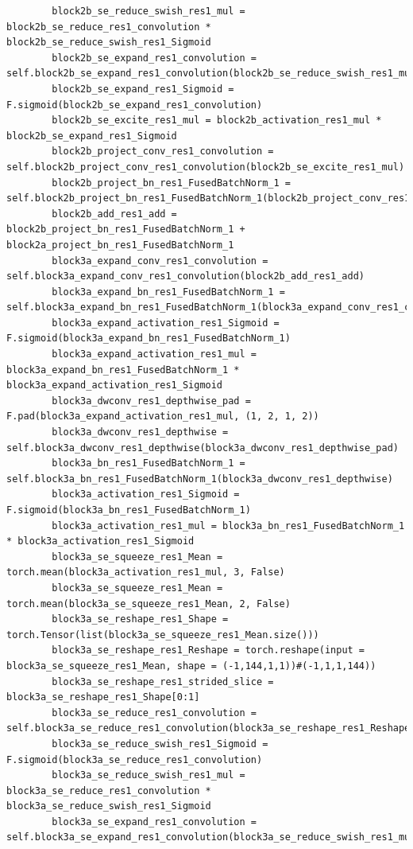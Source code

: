\documentclass{fisatprojectfinal}
\begin{document}
\begin{appendices}
\begin{lstlisting}
        block2b_se_reduce_swish_res1_mul = block2b_se_reduce_res1_convolution * block2b_se_reduce_swish_res1_Sigmoid
        block2b_se_expand_res1_convolution = self.block2b_se_expand_res1_convolution(block2b_se_reduce_swish_res1_mul)
        block2b_se_expand_res1_Sigmoid = F.sigmoid(block2b_se_expand_res1_convolution)
        block2b_se_excite_res1_mul = block2b_activation_res1_mul * block2b_se_expand_res1_Sigmoid
        block2b_project_conv_res1_convolution = self.block2b_project_conv_res1_convolution(block2b_se_excite_res1_mul)
        block2b_project_bn_res1_FusedBatchNorm_1 = self.block2b_project_bn_res1_FusedBatchNorm_1(block2b_project_conv_res1_convolution)
        block2b_add_res1_add = block2b_project_bn_res1_FusedBatchNorm_1 + block2a_project_bn_res1_FusedBatchNorm_1
        block3a_expand_conv_res1_convolution = self.block3a_expand_conv_res1_convolution(block2b_add_res1_add)
        block3a_expand_bn_res1_FusedBatchNorm_1 = self.block3a_expand_bn_res1_FusedBatchNorm_1(block3a_expand_conv_res1_convolution)
        block3a_expand_activation_res1_Sigmoid = F.sigmoid(block3a_expand_bn_res1_FusedBatchNorm_1)
        block3a_expand_activation_res1_mul = block3a_expand_bn_res1_FusedBatchNorm_1 * block3a_expand_activation_res1_Sigmoid
        block3a_dwconv_res1_depthwise_pad = F.pad(block3a_expand_activation_res1_mul, (1, 2, 1, 2))
        block3a_dwconv_res1_depthwise = self.block3a_dwconv_res1_depthwise(block3a_dwconv_res1_depthwise_pad)
        block3a_bn_res1_FusedBatchNorm_1 = self.block3a_bn_res1_FusedBatchNorm_1(block3a_dwconv_res1_depthwise)
        block3a_activation_res1_Sigmoid = F.sigmoid(block3a_bn_res1_FusedBatchNorm_1)
        block3a_activation_res1_mul = block3a_bn_res1_FusedBatchNorm_1 * block3a_activation_res1_Sigmoid
        block3a_se_squeeze_res1_Mean = torch.mean(block3a_activation_res1_mul, 3, False)
        block3a_se_squeeze_res1_Mean = torch.mean(block3a_se_squeeze_res1_Mean, 2, False)
        block3a_se_reshape_res1_Shape = torch.Tensor(list(block3a_se_squeeze_res1_Mean.size()))
        block3a_se_reshape_res1_Reshape = torch.reshape(input = block3a_se_squeeze_res1_Mean, shape = (-1,144,1,1))#(-1,1,1,144))
        block3a_se_reshape_res1_strided_slice = block3a_se_reshape_res1_Shape[0:1]
        block3a_se_reduce_res1_convolution = self.block3a_se_reduce_res1_convolution(block3a_se_reshape_res1_Reshape)
        block3a_se_reduce_swish_res1_Sigmoid = F.sigmoid(block3a_se_reduce_res1_convolution)
        block3a_se_reduce_swish_res1_mul = block3a_se_reduce_res1_convolution * block3a_se_reduce_swish_res1_Sigmoid
        block3a_se_expand_res1_convolution = self.block3a_se_expand_res1_convolution(block3a_se_reduce_swish_res1_mul)

\end{lstlisting}
\end{appendices}
\end{document}

